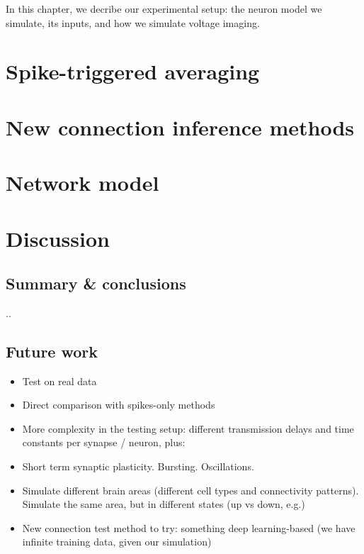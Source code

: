 \documentclass[a4paper, oneside, 11pt]{memoir}
\begin{document}
In this chapter, we decribe our experimental setup: the neuron model we simulate, its inputs, and how we simulate voltage imaging.





\chapter{Spike-triggered averaging}
\label{ch:STA}




\chapter{New connection inference methods}
\label{ch4}




\chapter{Network model}
\label{ch5}




\chapter{Discussion}

\section{Summary \& conclusions}

..

\section{Future work}

\begin{itemize}
    \item Test on real data
    \item Direct comparison with spikes-only methods
    \item More complexity in the testing setup: different transmission delays and time constants per synapse / neuron, plus:
    \item Short term synaptic plasticity. Bursting. Oscillations.
    \item Simulate different brain areas (different cell types and connectivity patterns). Simulate the same area, but in different states (up vs down, e.g.)
    \item New connection test method to try: something deep learning-based (we have infinite training data, given our simulation)
\end{itemize}

\References
\end{document}
